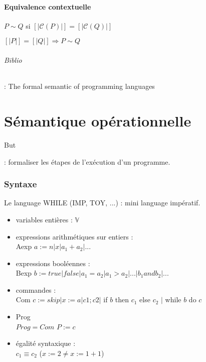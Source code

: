 \documentclass[10pt,a4paper]{article}
\newcommand{\semm}[1]{\left[| #1 | \right]}
\begin{document}
\subsection{Equivalence contextuelle}
$P \sim Q$ si $\semm{\mathcal{C}(P)} = \semm{\mathcal{C}(Q)}$
\begin{propriete}[Compostionnalité] 
$\semm{P} = \semm{Q}  \Rightarrow P \sim Q$
\end{propriete}
\paragraph{Biblio} :
The formal semantic of programming languages

\part{Sémantique opérationnelle}

\subparagraph{But} : formaliser les étapes de l'exécution d'un programme.

\section{Syntaxe}
Le language WHILE (IMP, TOY, ...) : mini language impératif.
\begin{itemize}
\item variables entières : $\mathbb{V}$
\item expressions arithmétiques sur entiers : \\
Aexp $ a := n \vert x \vert a_1 + a_2 \vert ...$
\item expressions booléennes : \\
Bexp $ b := true | false | a_1 = a_2 | a_1 > a_2 | ... | b_1 and b_2 | ...$
\item commandes : \\
Com $c := skip \vert x := a | c1; c2 |$ if $b$ then $c_1$ else $c_2$ $|$ while $b$ do $c$
\item Prog \\
$Prog = Com$ $P := c$
\item égalité syntaxique : \\
$c_1 \equiv c_2$ ($x := 2 \neq x := 1 + 1$)
\end{itemize}
\end{document}
